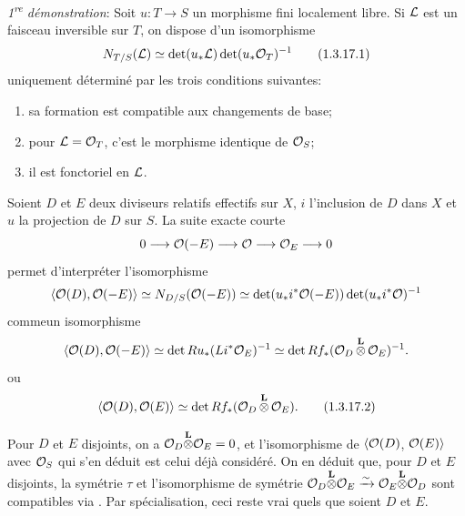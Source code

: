 \documentclass[10pt]{../fichiers-configuration-latex/smfart}
\begin{document}
\emph{1\textsuperscript{re} démonstration}: Soit $u:T\rightarrow S$ un morphisme
fini localement libre. Si ${\mathcal L}$ est un faisceau inversible sur
$T$, on dispose d'un isomorphisme
\begin{equation*}
N_{T/S}({\mathcal L})\simeq \det(u_{\ast}{\mathcal L})\det(u_{\ast}{\mathcal O}_{T})^{-1}\tag{1.3.17.1}
\end{equation*}%
uniquement déterminé par les trois conditions suivantes:
\begin{enumerate}
\renewcommand{\theenumi}{\alph{enumi}}
\renewcommand{\labelenumi}{\theenumi)}
\item sa formation est compatible aux changements de base;

\item pour ${\mathcal L}={\mathcal O}_{T}$, c'est le morphisme identique de
${\mathcal O}_{S}$;

\item il est fonctoriel en ${\mathcal L}$.
\end{enumerate}

Soient $D$ et $E$ deux diviseurs relatifs effectifs sur $X$, $i$
l'inclusion de $D$ dans $X$ et $u$ la projection de $D$ sur $S$. La
suite exacte courte
$$
0\longrightarrow {\mathcal O} (-E)\longrightarrow {\mathcal O}\longrightarrow
{\mathcal O}_{E}\longrightarrow 0
$$
permet d'interpréter l'isomorphisme
$$
\langle {\mathcal O}(D),{\mathcal O}(-E)\rangle \simeq N_{D/S}({\mathcal O}(-E))\simeq
\det(u_{\ast}i^{\ast}{\mathcal O}(-E))\det (u_{\ast}i^{\ast}{\mathcal O})^{-1}
$$
comme\pageoriginale un isomorphisme
$$
\langle {\mathcal O}(D),{\mathcal O}(-E)\rangle \simeq\det Ru_{\ast}(Li^{\ast}{\mathcal O}_{E})^{-1}\simeq
\det Rf_{\ast}({\mathcal O}_{D}\mathop{\otimes}^{\mathbf{L}}
{\mathcal O}_{E})^{-1}{}.
$$
ou
\begin{equation*}
\langle {\mathcal O}(D),{\mathcal O}(E)\rangle \simeq \det Rf_{\ast}({\mathcal O}_{D}\mathop{\otimes}^{\mathbf{L}}{\mathcal O}_{E}){}.\tag{1.3.17.2}
\end{equation*}

Pour $D$ et $E$ disjoints, on a
${\mathcal O}_{D}\displaystyle{\mathop{\otimes}^{\mathbf{L}}}{\mathcal O}_{E}=0$, et
l'isomorphisme de $\langle {\mathcal O}(D)$, ${\mathcal O}(E)\rangle $ avec ${\mathcal O}_{S}$
qui s'en déduit est celui déjà considéré. On en déduit que, pour $D$
et $E$ disjoints, la symétrie $\tau$ et l'isomorphisme de symétrie
${\mathcal O}_{D}\displaystyle{\mathop{\otimes}^{\mathbf{L}}}{\mathcal O}_{E}\xrightarrow{\sim}{\mathcal O}_{E}\displaystyle{\mathop{\otimes}^{\mathbf{L}}}{\mathcal O}_{D}$
sont compatibles via . Par spécialisation,
ceci reste vrai quels que soient $D$ et $E$.
\end{document}

